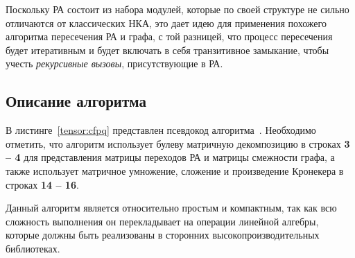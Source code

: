Поскольку РА состоит из набора модулей, которые по своей структуре не сильно отличаются от классических НКА, это дает идею для применения похожего алгоритма пересечения РА и графа, с той  разницей, что процесс пересечения будет итеративным и будет включать в себя транзитивное замыкание, чтобы учесть \textit{рекурсивные вызовы}, присутствующие в РА. 

\subsection{Описание алгоритма}

В листинге~\ref{tensor:cfpq} представлен псевдокод алгоритма~\cite{inbook:kronecker_cfpq_adbis}. Необходимо отметить, что алгоритм использует булеву матричную декомпозицию в строках \textbf{3 -- 4} для представления матрицы переходов РА и матрицы смежности графа, а также использует матричное умножение, сложение и произведение Кронекера в строках \textbf{14 -- 16}.

Данный алгоритм является относительно простым и компактным, так как всю сложность выполнения он перекладывает на операции линейной алгебры, которые должны быть реализованы в сторонних высокопроизводительных библиотеках.

